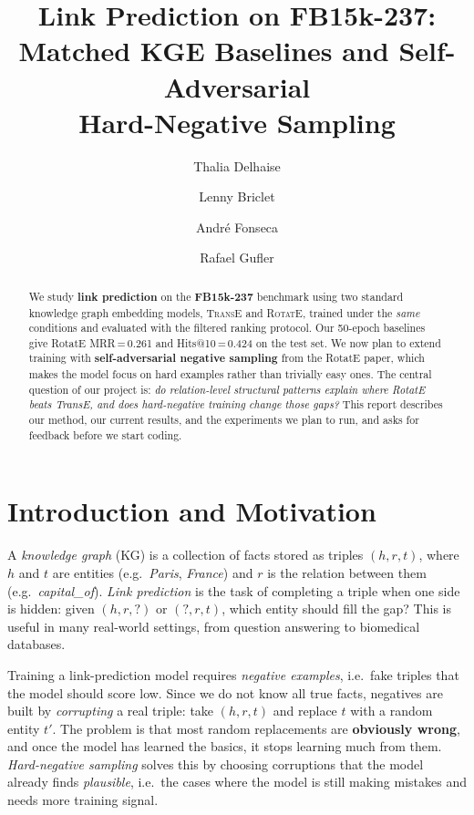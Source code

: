 \documentclass{llncs}
\begin{document}
\title{Link Prediction on FB15k-237:\\
Matched KGE Baselines and Self-Adversarial\\
Hard-Negative Sampling}

\author{Thalia Delhaise \and Lenny Briclet \and
        Andr\'e Fonseca \and Rafael Gufler}


\maketitle

\begin{abstract}
We study \textbf{link prediction} on the \textbf{FB15k-237} benchmark
using two standard knowledge graph embedding models, \textsc{TransE} and
\textsc{RotatE}, trained under the \emph{same} conditions and evaluated
with the filtered ranking protocol.
Our 50-epoch baselines give RotatE MRR\,=\,0.261 and Hits@10\,=\,0.424
on the test set.
We now plan to extend training with \textbf{self-adversarial negative
sampling} from the RotatE paper, which makes the model focus on hard
examples rather than trivially easy ones.
The central question of our project is: \emph{do relation-level structural
patterns explain where RotatE beats TransE, and does hard-negative training
change those gaps?}
This report describes our method, our current results, and the experiments
we plan to run, and asks for feedback before we start coding.
\end{abstract}

\section{Introduction and Motivation}

A \emph{knowledge graph} (KG) is a collection of facts stored as triples
$(h,r,t)$, where $h$ and $t$ are entities (e.g.\ \emph{Paris},
\emph{France}) and $r$ is the relation between them (e.g.\
\emph{capital\_of}).
\emph{Link prediction} is the task of completing a triple when one side is
hidden: given $(h,r,?)$ or $(?,r,t)$, which entity should fill the gap?
This is useful in many real-world settings, from question answering to
biomedical databases.

Training a link-prediction model requires \emph{negative examples}, i.e.\
fake triples that the model should score low.
Since we do not know all true facts, negatives are built by \emph{corrupting}
a real triple: take $(h,r,t)$ and replace $t$ with a random entity $t'$.
The problem is that most random replacements are \textbf{obviously wrong},
and once the model has learned the basics, it stops learning much from them.
\emph{Hard-negative sampling} solves this by choosing corruptions that
the model already finds \emph{plausible}, i.e.\ the cases where the
model is still making mistakes and needs more training signal.
\end{document}
